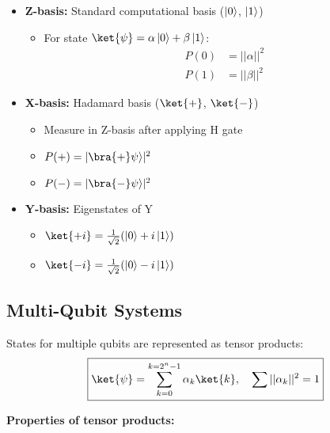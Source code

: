  \begin{itemize}
    \item \textbf{Z-basis:} Standard computational basis ($\left|0\right\rangle$, $\left|1\right\rangle$)

      \begin{itemize}[label={*}]
        \item For state $\ket{\psi} = \alpha\zero + \beta\one$:
          \begin{align*}
            P(0) &= ||\alpha||^2 \\
            P(1) &= ||\beta||^2
          \end{align*}
      \end{itemize}

    \item \textbf{X-basis:} Hadamard basis ($\ket{+}$, $\ket{-}$)

      \begin{itemize}[label={*}]
        \item Measure in Z-basis after applying H gate

        \item $P(+) = |\bra{+}\psi\rangle|^2$

        \item $P(-) = |\bra{-}\psi\rangle|^2$
      \end{itemize}

    \item \textbf{Y-basis:} Eigenstates of Y

      \begin{itemize}[label={*}]
        \item $\ket{+i} = \frac{1}{\sqrt{2}}(\zero + i\one)$

        \item $\ket{-i} = \frac{1}{\sqrt{2}}(\zero - i\one)$
      \end{itemize}

  \end{itemize}


  \subsection*{Multi-Qubit Systems}

  States for multiple qubits are represented as
  tensor products:
  \[
    \boxed{
      \ket{\psi} = \sum_{k=0}^{k = 2^n-1} \alpha_k \ket{k}, \quad \sum
      ||\alpha_k||^2 = 1
    }
  \]

  \noindent
  \textbf{Properties of tensor products:}

